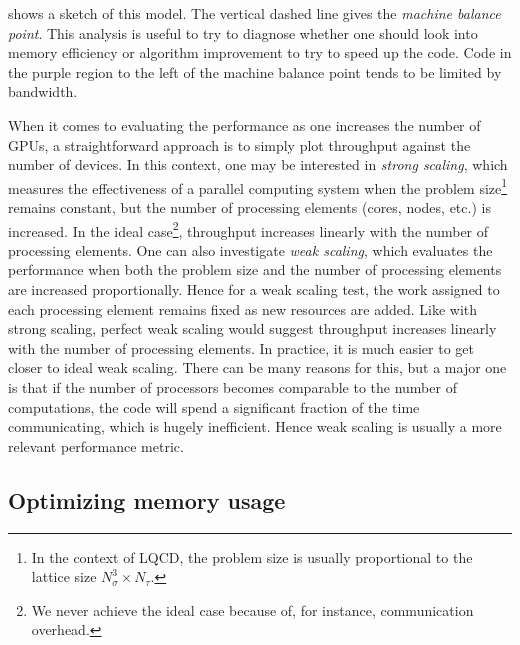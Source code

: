  shows a sketch of this model. The vertical
dashed line gives the {\it machine balance point}.
This analysis is useful to try to diagnose whether one should look into
memory efficiency or algorithm improvement to try to speed up the code.
Code in the purple region to the left of the machine balance point
tends to be limited by bandwidth.

When it comes to evaluating the performance as one increases the number
of GPUs, a straightforward approach is to simply plot throughput against
the number of devices. In this context, one may be interested in
{\it strong scaling}, which measures the effectiveness 
of a parallel computing system when the problem size\footnote{In the context
of LQCD, the problem size is usually proportional to the lattice size
$N_\sigma^3\times N_\tau$.} remains constant, 
but the number of processing elements (cores, nodes, etc.) is increased.
In the ideal case\footnote{We never achieve the ideal case because of,
for instance, communication overhead.}, throughput
increases linearly with the number of processing elements.
One can also investigate {\it weak scaling},
which evaluates the performance when both the problem size and the number 
of processing elements are increased proportionally. 
Hence for a weak scaling test, the work assigned to each processing element 
remains fixed as new resources are added. Like with strong scaling,
perfect weak scaling would suggest throughput increases linearly with
the number of processing elements. In practice, it is much easier to
get closer to ideal weak scaling. There can be many reasons
for this, but a major one is that if the number of processors becomes
comparable to the number of computations, the code will spend a significant fraction
of the time communicating, which is hugely inefficient. Hence weak scaling is
usually a more relevant performance metric. 


\subsection{Optimizing memory usage}\label{sec:memory}

